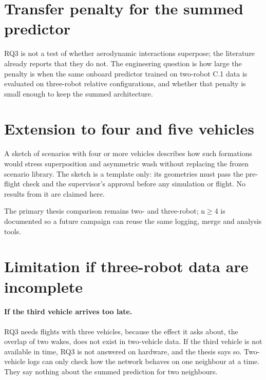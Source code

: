 \section{Transfer penalty for the summed predictor}
\label{sec:res3-transfer}

RQ3 is not a test of whether aerodynamic interactions superpose; the literature already reports that
they do not. The engineering question is how large the penalty is when the same onboard predictor
trained on two-robot C.1 data is evaluated on three-robot relative configurations, and whether that
penalty is small enough to keep the summed architecture.



\section{Extension to four and five vehicles}
\label{sec:res3-n4sketch}

A sketch of scenarios with four or more vehicles describes how such formations would stress
superposition and asymmetric wash without replacing the frozen scenario library. The sketch is a
template only: its geometries must pass the pre-flight check and the supervisor's approval before any
simulation or flight. No results from it are claimed here.

The primary thesis comparison remains two- and three-robot; n$\geq$4 is documented so a future
campaign can reuse the same logging, merge and analysis tools.

\section{Limitation if three-robot data are incomplete}
\label{sec:res3-limitation}

\paragraph{If the third vehicle arrives too late.}
RQ3 needs flights with three vehicles, because the effect it asks about, the overlap of two wakes,
does not exist in two-vehicle data. If the third vehicle is not available in time, RQ3 is not
answered on hardware, and the thesis says so. Two-vehicle logs can only check how the network behaves
on one neighbour at a time. They say nothing about the summed prediction for two neighbours.

